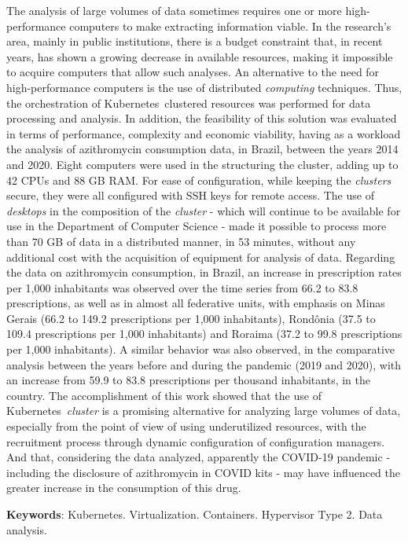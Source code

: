 
\begin{resumo}[Abstract]
    The analysis of large volumes of data sometimes requires one or more high-performance computers to make extracting information viable. In the research's area, mainly in public institutions, there is a budget constraint that, in recent years, has shown a growing decrease in available resources, making it impossible to acquire computers that allow such analyses. An alternative to the need for high-performance computers is the use of distributed \emph{computing} techniques. Thus, the orchestration of Kubernetes\textregistered\ clustered resources was performed for data processing and analysis. In addition, the feasibility of this solution was evaluated in terms of performance, complexity and economic viability, having as a workload the analysis of azithromycin consumption data, in Brazil, between the years 2014 and 2020. Eight computers were used in the structuring the cluster, adding up to 42 CPUs and 88 GB RAM. For ease of configuration, while keeping the \emph{clusters} secure, they were all configured with SSH keys for remote access. The use of \emph{desktops} in the composition of the \emph{cluster} - which will continue to be available for use in the Department of Computer Science - made it possible to process more than 70 GB of data in a distributed manner, in 53 minutes, without any additional cost with the acquisition of equipment for analysis of data. Regarding the data on azithromycin consumption, in Brazil, an increase in prescription rates per 1,000 inhabitants was observed over the time series from 66.2 to 83.8 prescriptions, as well as in almost all federative units, with emphasis on Minas Gerais (66.2 to 149.2 prescriptions per 1,000 inhabitants), Rondônia (37.5 to 109.4 prescriptions per 1,000 inhabitants) and Roraima (37.2 to 99.8 prescriptions per 1,000 inhabitants). A similar behavior was also observed, in the comparative analysis between the years before and during the pandemic (2019 and 2020), with an increase from 59.9 to 83.8 prescriptions per thousand inhabitants, in the country. The accomplishment of this work showed that the use of Kubernetes\textregistered\ \emph{cluster} is a promising alternative for analyzing large volumes of data, especially from the point of view of using underutilized resources, with the recruitment process through dynamic configuration of configuration managers. And that, considering the data analyzed, apparently the COVID-19 pandemic - including the disclosure of azithromycin in COVID kits - may have influenced the greater increase in the consumption of this drug.


    \textbf{Keywords}: Kubernetes. Virtualization. Containers. Hypervisor Type 2. Data analysis.
\end{resumo}

